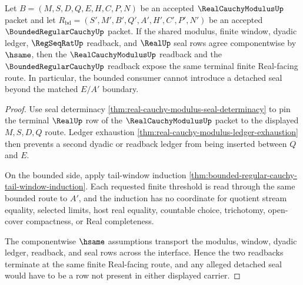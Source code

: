 \begin{theorem}
\label{thm:real-cauchy-modulus-bounded-readback-coherence}
Let $B=(M,S,D,Q,E,H,C,P,N)$ be an accepted $\RealCauchyModulusUp$ packet and let $R_{\mathrm{bd}}=(S',M',B',Q',A',H',C',P',N')$ be an accepted $\BoundedRegularCauchyUp$ packet. If the shared modulus, finite window, dyadic ledger, $\RegSeqRatUp$ readback, and $\RealUp$ seal rows agree componentwise by $\hsame$, then the $\RealCauchyModulusUp$ readback and the $\BoundedRegularCauchyUp$ readback expose the same terminal finite Real-facing route. In particular, the bounded consumer cannot introduce a detached seal beyond the matched $E/A'$ boundary.
\end{theorem}
\begin{proof}
Use seal determinacy \autoref{thm:real-cauchy-modulus-seal-determinacy} to pin the terminal $\RealUp$ row of the $\RealCauchyModulusUp$ packet to the displayed $M,S,D,Q$ route. Ledger exhaustion \autoref{thm:real-cauchy-modulus-ledger-exhaustion} then prevents a second dyadic or readback ledger from being inserted between $Q$ and $E$.

On the bounded side, apply tail-window induction \autoref{thm:bounded-regular-cauchy-tail-window-induction}. Each requested finite threshold is read through the same bounded route to $A'$, and the induction has no coordinate for quotient stream equality, selected limits, host real equality, countable choice, trichotomy, open-cover compactness, or Real completeness.

The componentwise $\hsame$ assumptions transport the modulus, window, dyadic ledger, readback, and seal rows across the interface. Hence the two readbacks terminate at the same finite Real-facing route, and any alleged detached seal would have to be a row not present in either displayed carrier.
\end{proof}

